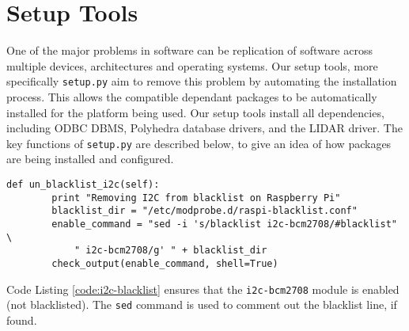 \section{Setup Tools}
\pagestyle{cameron}



One of the major problems in software can be replication of software across multiple devices, architectures and operating systems. Our setup tools, more specifically \texttt{setup.py} aim to remove this problem by automating the installation process. This allows the compatible dependant packages to be automatically installed for the platform being used.
\newline
Our setup tools install all dependencies, including ODBC \gls{DBMS}, Polyhedra database drivers, and the \gls{LIDAR} driver.
\newline
The key functions of \texttt{setup.py} are described below, to give an idea of how packages are being installed and configured.
\begin{lstlisting}[style=custompython,label=code:i2c-blacklist,caption=Remove I2C from backlist function]
def un_blacklist_i2c(self):
        print "Removing I2C from blacklist on Raspberry Pi"
        blacklist_dir = "/etc/modprobe.d/raspi-blacklist.conf"
        enable_command = "sed -i 's/blacklist i2c-bcm2708/#blacklist" \
            " i2c-bcm2708/g' " + blacklist_dir
        check_output(enable_command, shell=True)
\end{lstlisting}
\noindent
Code Listing \ref{code:i2c-blacklist} ensures that the \texttt{i2c-bcm2708} module is enabled (not blacklisted). The \texttt{sed} command is used to comment out the blacklist line, if found.

